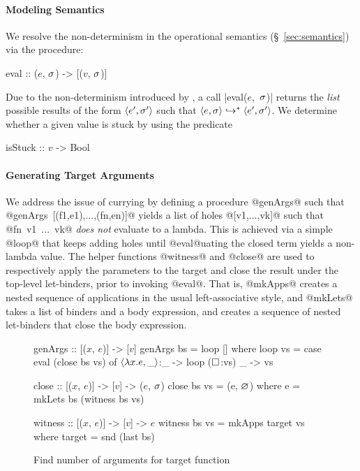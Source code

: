 \paragraph{Modeling Semantics}
%
We resolve the non-determinism in the operational semantics
(\S~\ref{sec:semantics}) via the procedure:
%
\begin{mcode}
  eval :: ($e$, $\sigma$) -> [($v$, $\sigma$)]
\end{mcode}
%
Due to the non-determinism introduced by \gensym, a call \hbox{|eval($e$, $\sigma$)|}
returns the \emph{list} possible results of the form $\langle e', \sigma' \rangle$ such
that $\langle e, \sigma \rangle \hookrightarrow^{*} \langle e', \sigma' \rangle$.
%
We determine whether a given value is stuck by using the predicate
%
\begin{mcode}
  isStuck :: $v$ -> Bool
\end{mcode}

\paragraph{Generating Target Arguments}
%
We address the issue of currying by defining a procedure @genArgs@ such that \\
\hbox{@genArgs [(f1,e1),...,(fn,en)]@} yields a list of holes @[v1,...,vk]@
such that \hbox{@fn v1 ... vk@} \emph{does not} evaluate to a lambda.
%
This is achieved via a simple @loop@ that keeps adding holes until
@eval@uating the closed term yields a non-lambda value.
%
The helper functions @witness@ and @close@ are used to respectively
apply the parameters to the target and close the result under the top-level
let-binders, prior to invoking @eval@.
%
That is, @mkApps@ creates a nested sequence of applications in
the usual left-associative style, and @mkLets@ takes a list of
binders and a body expression, and creates a sequence of nested
let-binders that close the body expression.

\begin{figure}[t]
\centering
\begin{mcode}
genArgs :: [($x$, $e$)] -> [$v$]
genArgs bs = loop []
  where
  loop vs  = case eval (close bs vs) of
               $\langle \lambda x. e, \_ \rangle$:_ -> loop ($\square_{}$:vs)
               _        -> vs

close :: [($x$, $e$)] -> [$v$] -> ($e$, $\sigma$)
close bs vs = (e, $\varnothing$)
  where
    e       = mkLets bs (witness bs vs)

witness :: [($x$, $e$)] -> [$v$] -> $e$
witness bs vs = mkApps target vs
  where
    target    = snd (last bs)
\end{mcode}
\caption{Find number of arguments for target function}
\label{fig:algo-gen-args}
\end{figure}


